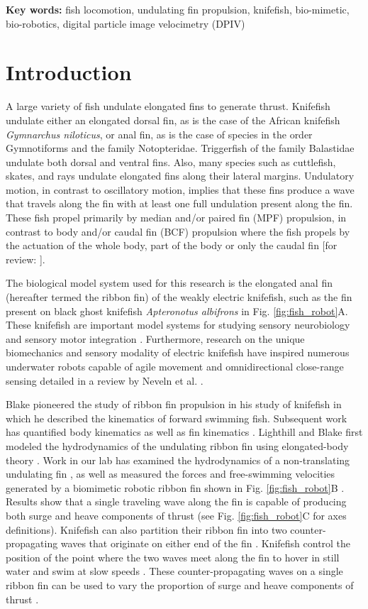 \documentclass[onecolumn]{IEEEtran}
\begin{document}
\textbf{Key words:} fish locomotion, undulating fin propulsion, knifefish, bio-mimetic, bio-robotics, digital particle image velocimetry (DPIV)

\section{Introduction}
\noindent
A large variety of fish undulate elongated fins to generate thrust.
Knifefish undulate either an elongated dorsal fin, as is the case of the
African knifefish \emph{Gymnarchus niloticus}, or anal fin, as is the
case of species in the order Gymnotiforms and the family Notopteridae.
Triggerfish of the family Balastidae undulate both dorsal and ventral
fins. Also, many species such as cuttlefish, skates, and rays undulate
elongated fins along their lateral margins. Undulatory motion, in contrast to oscillatory
motion, implies that these fins produce a wave that travels along the fin
with at least one full undulation present along the fin. These fish propel
primarily by median and/or paired fin (MPF) propulsion, in contrast to
body and/or caudal fin (BCF) propulsion where the fish propels by the
actuation of the whole body, part of the body or only the caudal fin [for review:
\citep*{Sfak99a}].

The biological model system used for this research is the elongated anal fin (hereafter termed
the ribbon fin) of the weakly electric knifefish, such as the fin present on black ghost
knifefish \emph{Apteronotus albifrons} in Fig. \ref{fig:fish_robot}A. These
knifefish are important model systems for studying sensory neurobiology
\citep*{Turn99a, Krah13a} and sensory motor
integration \citep*{Snyd07a,MacI10a,Cowa07a}. Furthermore, research on the unique
biomechanics and sensory modality of electric knifefish have inspired
numerous underwater robots capable of agile movement and omnidirectional
close-range sensing detailed in a review by Neveln et al. \citep*{Neve13a}.

Blake pioneered the study of ribbon fin propulsion in his study
of knifefish \citep*{Blak83a} in which he described the
kinematics of forward swimming fish.  Subsequent work has quantified body 
kinematics \citep{MacI01a} as well as fin kinematics \citep{Ruiz13a}. Lighthill and Blake first modeled 
the hydrodynamics of the undulating ribbon
fin using elongated-body theory \citep*{Ligh90a}. Work in our lab has examined the
hydrodynamics of a non-translating undulating fin \citep*{Shir08a}, as well as
measured the forces and free-swimming velocities generated by a biomimetic
robotic ribbon fin shown in Fig. \ref{fig:fish_robot}B \citep*{Cure11a}. Results
show that a single traveling wave
along the fin is capable of producing both surge and heave components of
thrust (see Fig. \ref{fig:fish_robot}C for axes definitions). Knifefish
can also partition their ribbon fin into two counter-propagating waves
that originate on either end of the fin 
\citep*{Cure11b}. Knifefish control the position of the point where the two
waves meet along the fin
to hover in still water and swim at slow speeds \citep*{Ruiz13a, Sefa12a}.
These counter-propagating waves on a single ribbon fin can be used to vary the
proportion of surge and
heave components of thrust \citep*{Cure11b, Sefa12a}.
\end{document}
